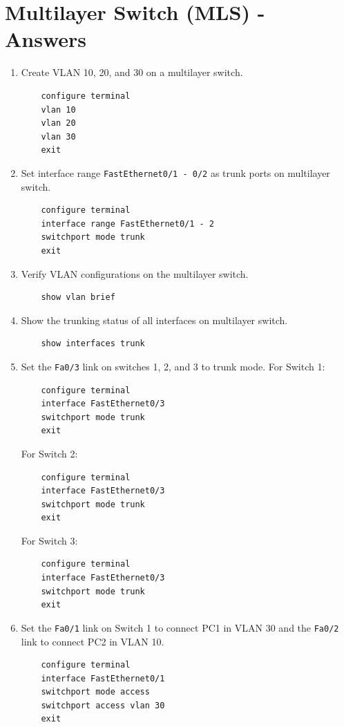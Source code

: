 \documentclass[a4paper]{book}
\begin{document}
\newpage

\chapter{Multilayer Switch (MLS) - Answers}

\begin{enumerate}
    \item Create VLAN 10, 20, and 30 on a multilayer switch.
    \begin{lstlisting}
    configure terminal
    vlan 10
    vlan 20
    vlan 30
    exit
    \end{lstlisting}

    \item Set interface range \texttt{FastEthernet0/1 - 0/2} as trunk ports on multilayer switch.
    \begin{lstlisting}
    configure terminal
    interface range FastEthernet0/1 - 2
    switchport mode trunk
    exit
    \end{lstlisting}
    \item Verify VLAN configurations on the multilayer switch.
    \begin{lstlisting}
    show vlan brief
    \end{lstlisting}

    \item Show the trunking status of all interfaces on multilayer switch.
    \begin{lstlisting}
    show interfaces trunk
    \end{lstlisting}
    \item Set the \texttt{Fa0/3} link on switches 1, 2, and 3 to trunk mode.
    For Switch 1:
    \begin{lstlisting}
    configure terminal
    interface FastEthernet0/3
    switchport mode trunk
    exit
    \end{lstlisting}

    For Switch 2:
    \begin{lstlisting}
    configure terminal
    interface FastEthernet0/3
    switchport mode trunk
    exit
    \end{lstlisting}

    For Switch 3:
    \begin{lstlisting}
    configure terminal
    interface FastEthernet0/3
    switchport mode trunk
    exit
    \end{lstlisting}
    \item Set the \texttt{Fa0/1} link on Switch 1 to connect PC1 in VLAN 30 and the \texttt{Fa0/2} link to connect PC2 in VLAN 10.
    \begin{lstlisting}
    configure terminal
    interface FastEthernet0/1
    switchport mode access
    switchport access vlan 30
    exit
    

\end{lstlisting}
\end{enumerate}
\end{document}
